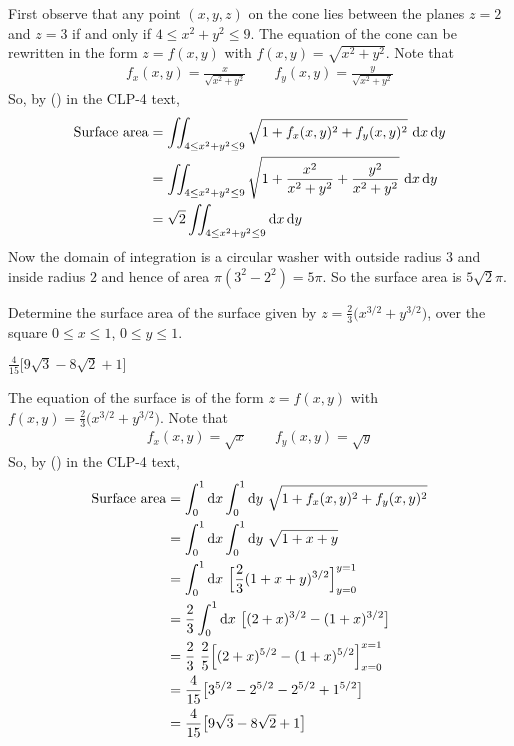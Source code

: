 \begin{solution}
First observe that any point $(x,y,z)$ on the cone lies between the 
planes $z=2$ and $z=3$ if and only if $4\le x^2+y^2\le 9$.
The equation of the cone can be rewritten in the form 
$z=f(x,y)$ with $f(x,y)=\sqrt{x^2+y^2}$. Note that
\begin{align*}
f_x(x,y)=\frac{x}{\sqrt{x^2+y^2}}\qquad
f_y(x,y)=\frac{y}{\sqrt{x^2+y^2}}
\end{align*}
So, by 
() in the CLP-4 text,
\begin{align*}
\text{Surface area}
&= \dblInt_{4\le x^2+y^2\le 9}\sqrt{1+f_x(x,y)^2+f_y(x,y)^2}\ \dee{x}\,\dee{y} \\
&= \dblInt_{4\le x^2+y^2\le 9}
    \sqrt{1+\frac{x^2}{x^2+y^2}+\frac{y^2}{x^2+y^2}}\ \dee{x}\,\dee{y} \\
&=\sqrt{2} \dblInt_{4\le x^2+y^2\le 9} \dee{x}\,\dee{y} 
\end{align*}
Now the domain of integration is a circular washer with outside radius $3$
and inside radius $2$ and hence of area $\pi(3^2-2^2)=5\pi$. So the surface area is $5\sqrt{2}\pi$.

\end{solution}
\begin{question}[M253 2015D] %
Determine the surface area of the surface given by 
$z = \frac{2}{3}\big(x^{3/2} + y^{3/2}\big)$, over the square
$0 \le  x \le  1$, $0 \le  y \le  1$.
\end{question}


\begin{answer}
$\frac{4}{15}\big[9\sqrt{3}-8\sqrt{2}+1\big]$
\end{answer}

\begin{solution}
The equation of the surface is of the form 
$z=f(x,y)$ with $f(x,y)=\frac{2}{3}\big(x^{3/2} + y^{3/2}\big)$. Note that
\begin{align*}
f_x(x,y)=\sqrt{x}\qquad
f_y(x,y)=\sqrt{y}
\end{align*}
So, by () in the CLP-4 text,
\begin{align*}
\text{Surface area}
&= \int_0^1\dee{x}\int_0^1\dee{y}\ \sqrt{1+f_x(x,y)^2+f_y(x,y)^2} \\
&= \int_0^1\dee{x}\int_0^1\dee{y}\ \sqrt{1+x+y} \\
&= \int_0^1\dee{x}\ \Big[\frac{2}{3}(1+x+y)^{3/2}\Big]_{y=0}^{y=1} \\
&= \frac{2}{3}\int_0^1\dee{x}\ \big[(2+x)^{3/2}-(1+x)^{3/2}\big] \\
&= \frac{2}{3}\ \frac{2}{5}\Big[(2+x)^{5/2}-(1+x)^{5/2}\Big]_{x=0}^{x=1} \\
&= \frac{4}{15} \big[3^{5/2}-2^{5/2}-2^{5/2}+1^{5/2}\big] \\
&= \frac{4}{15}\big[9\sqrt{3}-8\sqrt{2}+1\big]
\end{align*}
\end{solution}

